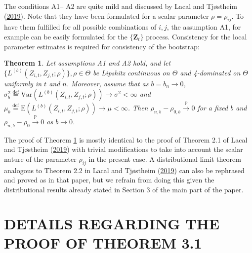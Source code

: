 \documentclass[
  12pt,
  letterpaper]{article}
\newtheorem{thm}{Theorem}[section]
\numberwithin{equation}{section}
\newcommand{\Z}{\bm{Z}}
\newcommand{\E}{\textrm{E}}
\newcommand{\Var}{\textrm{Var}}
\begin{document}
The conditions A1-- A2 are quite mild and discussed by Lacal and Tjøstheim (\protect\hyperlink{ref-lacal2018estimating}{2019}). Note that they have been formulated for a scalar parameter \(\rho = \rho_{ij}\). To have them fulfilled for all possible combinations of \(i,j\), the assumption A1, for example can be easily formulated for the \(\{\Z_t\}\) process. Consistency for the local parameter estimates is required for consistency of the bootstrap:

\begin{thm} Let assumptions A1 and A2 hold, and let $\{L^{(b)}(Z_{i,t}, Z_{j,t};\rho)\}, \rho \in \Theta$ be Lipshitz continuous on $\Theta$ and 4-dominated on $\Theta$ uniformly in $t$ and $n$. Moreover, assume that as $b=b_n\rightarrow 0$, $\sigma^2_b \stackrel{\textrm{def}}{=} \Var\left(L^{(b)}(Z_{i,t}, Z_{j,t};\rho)\right) \rightarrow \sigma^2 < \infty$ and $\mu_b \stackrel{\textrm{def}}{=} \E\left(L^{(b)}(Z_{i,t}, Z_{j,t};\rho)\right) \rightarrow \mu < \infty$. Then $\rho_{n,b} - \rho_{0,b} \stackrel{\mathbb{P}}{\rightarrow} 0$ for a fixed $b$ and $\rho_{n,b} - \rho_{0} \stackrel{\mathbb{P}}{\rightarrow} 0$ as $b \rightarrow 0$.
\label{thm:A1}
\end{thm}

The proof of Theorem \ref{thm:A1} is mostly identical to the proof of Theorem 2.1 of Lacal and Tjøstheim (\protect\hyperlink{ref-lacal2018estimating}{2019}) with trivial modifications to take into account the scalar nature of the parameter \(\rho_{ij}\) in the present case. A distributional limit theorem analogous to Theorem 2.2 in Lacal and Tjøstheim (\protect\hyperlink{ref-lacal2018estimating}{2019}) can also be rephrased and proved as in that paper, but we refrain from doing this given the distributional results already stated in Section 3 of the main part of the paper.

\hypertarget{app-loccor}{%
\section{DETAILS REGARDING THE PROOF OF THEOREM 3.1}\label{app-loccor}}
\end{document}
